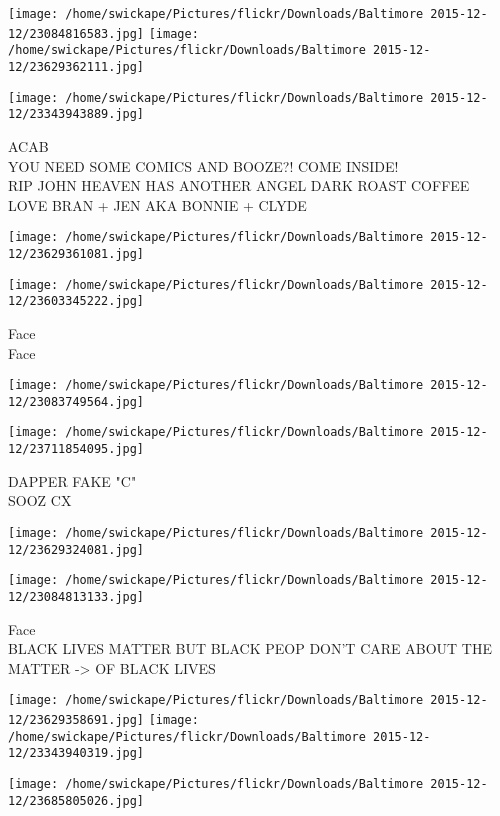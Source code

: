 \documentclass[10pt,letterpaper]{article}
\begin{document}
\texttt{[image: /home/swickape/Pictures/flickr/Downloads/Baltimore 2015-12-12/23084816583.jpg]}
\texttt{[image: /home/swickape/Pictures/flickr/Downloads/Baltimore 2015-12-12/23629362111.jpg]}

\vspace{0.25in}
\texttt{[image: /home/swickape/Pictures/flickr/Downloads/Baltimore 2015-12-12/23343943889.jpg]}

ACAB\\
YOU NEED SOME COMICS AND BOOZE?!  COME INSIDE!\\
RIP JOHN HEAVEN HAS ANOTHER ANGEL DARK ROAST COFFEE LOVE BRAN + JEN AKA BONNIE + CLYDE
\pagebreak

\texttt{[image: /home/swickape/Pictures/flickr/Downloads/Baltimore 2015-12-12/23629361081.jpg]}

\vspace{0.25in}
\texttt{[image: /home/swickape/Pictures/flickr/Downloads/Baltimore 2015-12-12/23603345222.jpg]}

Face\\
Face
\pagebreak

\texttt{[image: /home/swickape/Pictures/flickr/Downloads/Baltimore 2015-12-12/23083749564.jpg]}

\vspace{0.25in}
\texttt{[image: /home/swickape/Pictures/flickr/Downloads/Baltimore 2015-12-12/23711854095.jpg]}

DAPPER FAKE "C"\\
SOOZ CX
\pagebreak

\texttt{[image: /home/swickape/Pictures/flickr/Downloads/Baltimore 2015-12-12/23629324081.jpg]}

\vspace{0.25in}
\texttt{[image: /home/swickape/Pictures/flickr/Downloads/Baltimore 2015-12-12/23084813133.jpg]}

Face\\
BLACK LIVES MATTER BUT BLACK PEOP DON'T CARE ABOUT THE MATTER {-}> OF BLACK LIVES
\pagebreak

\texttt{[image: /home/swickape/Pictures/flickr/Downloads/Baltimore 2015-12-12/23629358691.jpg]}
\texttt{[image: /home/swickape/Pictures/flickr/Downloads/Baltimore 2015-12-12/23343940319.jpg]}

\texttt{[image: /home/swickape/Pictures/flickr/Downloads/Baltimore 2015-12-12/23685805026.jpg]}
\end{document}
